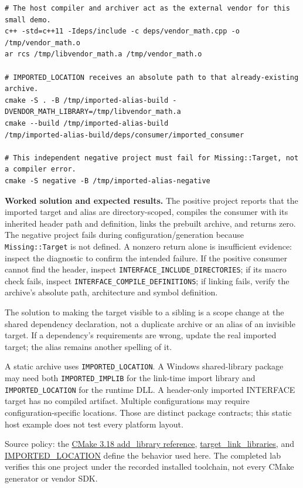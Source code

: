 \begin{verbatim}
# The host compiler and archiver act as the external vendor for this small demo.
c++ -std=c++11 -Ideps/include -c deps/vendor_math.cpp -o /tmp/vendor_math.o
ar rcs /tmp/libvendor_math.a /tmp/vendor_math.o

# IMPORTED_LOCATION receives an absolute path to that already-existing archive.
cmake -S . -B /tmp/imported-alias-build -DVENDOR_MATH_LIBRARY=/tmp/libvendor_math.a
cmake --build /tmp/imported-alias-build
/tmp/imported-alias-build/deps/consumer/imported_consumer

# This independent negative project must fail for Missing::Target, not a compiler error.
cmake -S negative -B /tmp/imported-alias-negative
\end{verbatim}

\textbf{Worked solution and expected results.} The positive project reports that the imported target and alias are directory-scoped, compiles the consumer with its inherited header path and definition, links the prebuilt archive, and returns zero. The negative project fails during configuration/generation because \texttt{Missing::Target} is not defined. A nonzero return alone is insufficient evidence: inspect the diagnostic to confirm the intended failure. If the positive consumer cannot find the header, inspect \texttt{INTERFACE\_INCLUDE\_DIRECTORIES}; if its macro check fails, inspect \texttt{INTERFACE\_COMPILE\_DEFINITIONS}; if linking fails, verify the archive's absolute path, architecture and symbol definition.

The solution to making the target visible to a sibling is a scope change at the shared dependency declaration, not a duplicate archive or an alias of an invisible target. If a dependency's requirements are wrong, update the real imported target; the alias remains another spelling of it.

A static archive uses \texttt{IMPORTED\_LOCATION}. A Windows shared-library package may need both \texttt{IMPORTED\_IMPLIB} for the link-time import library and \texttt{IMPORTED\_LOCATION} for the runtime DLL. A header-only imported INTERFACE target has no compiled artifact. Multiple configurations may require configuration-specific locations. Those are distinct package contracts; this static host example does not test every platform layout.

Source policy: the \href{https://cmake.org/cmake/help/v3.18/command/add_library.html}{CMake 3.18 add\_library reference}, \href{https://cmake.org/cmake/help/v3.18/command/target_link_libraries.html}{target\_link\_libraries}, and \href{https://cmake.org/cmake/help/v3.18/prop_tgt/IMPORTED_LOCATION.html}{IMPORTED\_LOCATION} define the behavior used here. The completed lab verifies this one project under the recorded installed toolchain, not every CMake generator or vendor SDK.

